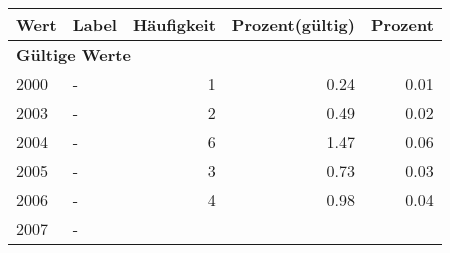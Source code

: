      \begin{longtable}{lXrrr}
     \toprule
     \textbf{Wert} & \textbf{Label} & \textbf{Häufigkeit} & \textbf{Prozent(gültig)} & \textbf{Prozent} \\
     \endhead
     \midrule
     \multicolumn{5}{l}{\textbf{Gültige Werte}}\\

     2000 &
     \multicolumn{1}{X}{ -  } &


       \num{1} &
       \num[round-mode=places,round-precision=2]{0,24} &
         \num[round-mode=places,round-precision=2]{0,01} \\

     2003 &
     \multicolumn{1}{X}{ -  } &


       \num{2} &
       \num[round-mode=places,round-precision=2]{0,49} &
         \num[round-mode=places,round-precision=2]{0,02} \\

     2004 &
     \multicolumn{1}{X}{ -  } &


       \num{6} &
       \num[round-mode=places,round-precision=2]{1,47} &
         \num[round-mode=places,round-precision=2]{0,06} \\

     2005 &
     \multicolumn{1}{X}{ -  } &


       \num{3} &
       \num[round-mode=places,round-precision=2]{0,73} &
         \num[round-mode=places,round-precision=2]{0,03} \\

     2006 &
     \multicolumn{1}{X}{ -  } &


       \num{4} &
       \num[round-mode=places,round-precision=2]{0,98} &
         \num[round-mode=places,round-precision=2]{0,04} \\

     2007 &
     \multicolumn{1}{X}{ -  } &



\end{longtable}
